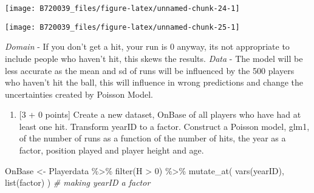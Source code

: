 \documentclass[
]{article}
\newenvironment{Shaded}{\begin{snugshade}}{\end{snugshade}}
\newcommand{\AttributeTok}[1]{\textcolor[rgb]{0.77,0.63,0.00}{#1}}
\newcommand{\CommentTok}[1]{\textcolor[rgb]{0.56,0.35,0.01}{\textit{#1}}}
\newcommand{\DecValTok}[1]{\textcolor[rgb]{0.00,0.00,0.81}{#1}}
\newcommand{\FunctionTok}[1]{\textcolor[rgb]{0.00,0.00,0.00}{#1}}
\newcommand{\NormalTok}[1]{#1}
\newcommand{\OtherTok}[1]{\textcolor[rgb]{0.56,0.35,0.01}{#1}}
\newcommand{\SpecialCharTok}[1]{\textcolor[rgb]{0.00,0.00,0.00}{#1}}
\providecommand{\tightlist}{%
  \setlength{\itemsep}{0pt}\setlength{\parskip}{0pt}}
\begin{document}
\begin{center}\texttt{[image: B720039\_files/figure-latex/unnamed-chunk-24-1]} \end{center}

\begin{Shaded}
\end{Shaded}

\begin{center}\texttt{[image: B720039\_files/figure-latex/unnamed-chunk-25-1]} \end{center}

\emph{Domain} - If you don't get a hit, your run is 0 anyway, its not
appropriate to include people who haven't hit, this skews the results.
\emph{Data} - The model will be less accurate as the mean and sd of runs
will be influenced by the 500 players who haven't hit the ball, this
will influence in wrong predictions and change the uncertainties created
by Poisson Model.

\begin{enumerate}
\def\labelenumi{\alph{enumi}.}
\setcounter{enumi}{1}
\tightlist
\item
  {[}3 + 0 points{]} Create a new dataset, OnBase of all players who
  have had at least one hit. Transform yearID to a factor. Construct a
  Poisson model, glm1, of the number of runs as a function of the number
  of hits, the year as a factor, position played and player height and
  age.
\end{enumerate}

\begin{Shaded}
\begin{Highlighting}[]
\NormalTok{OnBase }\OtherTok{\textless{}{-}}\NormalTok{ Playerdata }\SpecialCharTok{\%\textgreater{}\%}
  \FunctionTok{filter}\NormalTok{(H }\SpecialCharTok{\textgreater{}} \DecValTok{0}\NormalTok{) }\SpecialCharTok{\%\textgreater{}\%}
  \FunctionTok{mutate\_at}\NormalTok{(}
    \FunctionTok{vars}\NormalTok{(yearID),}
    \FunctionTok{list}\NormalTok{(factor)}
\NormalTok{  ) }\CommentTok{\# making yearID a factor}
\end{Highlighting}
\end{Shaded}
\end{document}
